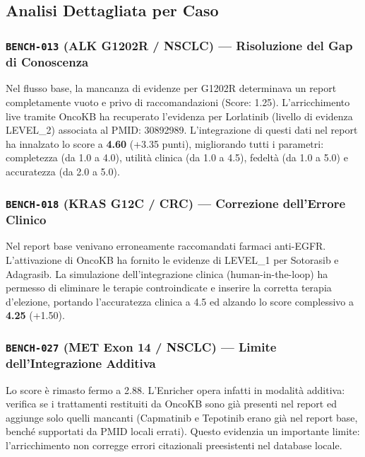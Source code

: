 \documentclass[12pt, a4paper]{article}
\newcommand{\bench}[1]{{\texttt{\textbf{#1}}}}
\begin{document}
\subsection{Analisi Dettagliata per Caso}

\subsubsection{\bench{BENCH-013} (ALK G1202R / NSCLC) --- Risoluzione del Gap di Conoscenza}
Nel flusso base, la mancanza di evidenze per G1202R determinava un report completamente vuoto e privo di raccomandazioni (Score: 1.25). L'arricchimento live tramite OncoKB ha recuperato l'evidenza per Lorlatinib (livello di evidenza LEVEL\_2) associata al PMID: 30892989. L'integrazione di questi dati nel report ha innalzato lo score a \textbf{4.60} (+3.35 punti), migliorando tutti i parametri: completezza (da 1.0 a 4.0), utilità clinica (da 1.0 a 4.5), fedeltà (da 1.0 a 5.0) e accuratezza (da 2.0 a 5.0).

\subsubsection{\bench{BENCH-018} (KRAS G12C / CRC) --- Correzione dell'Errore Clinico}
Nel report base venivano erroneamente raccomandati farmaci anti-EGFR. L'attivazione di OncoKB ha fornito le evidenze di LEVEL\_1 per Sotorasib e Adagrasib. La simulazione dell'integrazione clinica (human-in-the-loop) ha permesso di eliminare le terapie controindicate e inserire la corretta terapia d'elezione, portando l'accuratezza clinica a 4.5 ed alzando lo score complessivo a \textbf{4.25} (+1.50).

\subsubsection{\bench{BENCH-027} (MET Exon 14 / NSCLC) --- Limite dell'Integrazione Additiva}
Lo score è rimasto fermo a 2.88. L'Enricher opera infatti in modalità additiva: verifica se i trattamenti restituiti da OncoKB sono già presenti nel report ed aggiunge solo quelli mancanti (Capmatinib e Tepotinib erano già nel report base, benché supportati da PMID locali errati). Questo evidenzia un importante limite: l'arricchimento non corregge errori citazionali preesistenti nel database locale.
\end{document}
